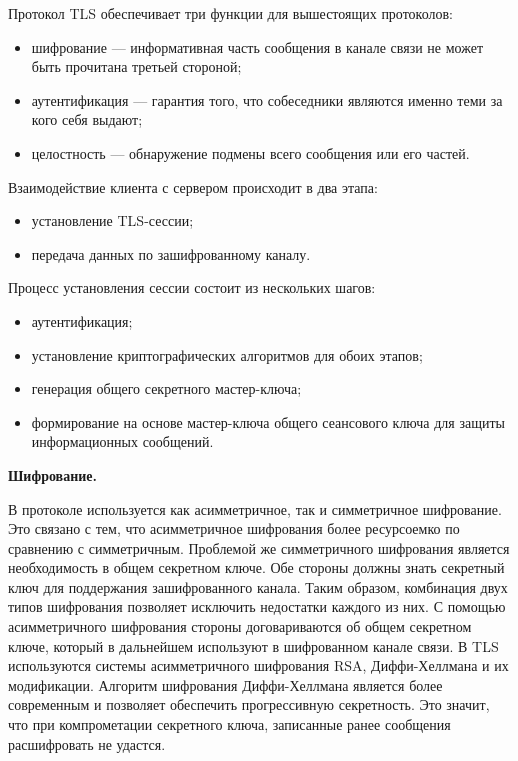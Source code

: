 Протокол TLS обеспечивает три функции для вышестоящих протоколов:

\begin{itemize}
	\item шифрование --- информативная часть сообщения в канале связи не может быть прочитана третьей стороной;
	\item аутентификация --- гарантия того, что собеседники являются именно теми за кого себя выдают;
	\item целостность --- обнаружение подмены всего сообщения или его частей.
\end{itemize}

Взаимодействие клиента с сервером происходит в два этапа:

\begin{itemize}
	\item установление TLS-сессии;
	\item передача данных по зашифрованному каналу.
\end{itemize}

Процесс установления сессии состоит из нескольких шагов:
\begin{itemize}
	\item аутентификация;
	\item установление криптографических алгоритмов для обоих этапов;
	\item генерация общего секретного мастер-ключа;
	\item формирование на основе мастер-ключа общего сеансового ключа для защиты информационных сообщений.
\end{itemize}

\textbf{Шифрование.}

В протоколе используется как асимметричное, так и симметричное шифрование. Это связано с тем, что асимметричное шифрования более ресурсоемко по сравнению с симметричным. Проблемой же симметричного шифрования является необходимость в общем секретном ключе. Обе стороны должны знать секретный ключ для поддержания зашифрованного канала. Таким образом, комбинация двух типов шифрования позволяет исключить недостатки каждого из них. С помощью асимметричного шифрования стороны договариваются об общем секретном ключе, который в дальнейшем используют в шифрованном канале связи. В TLS используются системы асимметричного шифрования RSA, Диффи-Хеллмана и их модификации. Алгоритм шифрования Диффи-Хеллмана является более современным и позволяет обеспечить прогрессивную секретность. Это значит, что при компрометации секретного ключа, записанные ранее сообщения расшифровать не удастся.

